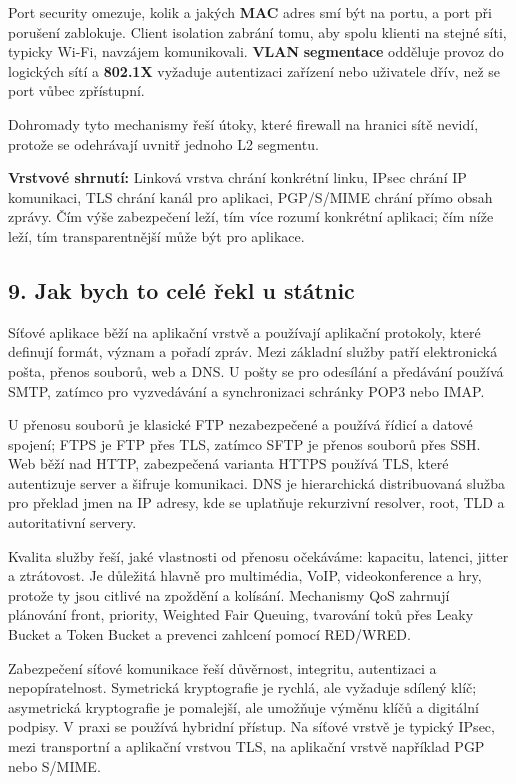 \documentclass[11pt,a4paper]{article}
\newcommand{\itbox}[1]{\medskip\noindent\colorbox{black!6}{\parbox{\dimexpr\linewidth-2\fboxsep}{#1}}\medskip}
\begin{document}
Port security omezuje, kolik a jakých \textbf{MAC} adres smí být na portu, a port při porušení zablokuje. Client isolation zabrání tomu, aby spolu klienti na stejné síti, typicky Wi-Fi, navzájem komunikovali. \textbf{VLAN} \textbf{segmentace} odděluje provoz do logických sítí a \textbf{802.1X} vyžaduje autentizaci zařízení nebo uživatele dřív, než se port vůbec zpřístupní.

Dohromady tyto mechanismy řeší útoky, které firewall na hranici sítě nevidí, protože se odehrávají uvnitř jednoho L2 segmentu.

\itbox{\textbf{Vrstvové shrnutí:} Linková vrstva chrání konkrétní linku, IPsec chrání IP komunikaci, TLS chrání kanál pro aplikaci, PGP/S/MIME chrání přímo obsah zprávy. Čím výše zabezpečení leží, tím více rozumí konkrétní aplikaci; čím níže leží, tím transparentnější může být pro aplikace.}

\subsection*{9. Jak bych to celé řekl u státnic}

Síťové aplikace běží na aplikační vrstvě a používají aplikační protokoly, které definují formát, význam a pořadí zpráv. Mezi základní služby patří elektronická pošta, přenos souborů, web a DNS. U pošty se pro odesílání a předávání používá SMTP, zatímco pro vyzvedávání a synchronizaci schránky POP3 nebo IMAP.

U přenosu souborů je klasické FTP nezabezpečené a používá řídicí a datové spojení; FTPS je FTP přes TLS, zatímco SFTP je přenos souborů přes SSH. Web běží nad HTTP, zabezpečená varianta HTTPS používá TLS, které autentizuje server a šifruje komunikaci. DNS je hierarchická distribuovaná služba pro překlad jmen na IP adresy, kde se uplatňuje rekurzivní resolver, root, TLD a autoritativní servery.

Kvalita služby řeší, jaké vlastnosti od přenosu očekáváme: kapacitu, latenci, jitter a ztrátovost. Je důležitá hlavně pro multimédia, VoIP, videokonference a hry, protože ty jsou citlivé na zpoždění a kolísání. Mechanismy QoS zahrnují plánování front, priority, Weighted Fair Queuing, tvarování toků přes Leaky Bucket a Token Bucket a prevenci zahlcení pomocí RED/WRED.

Zabezpečení síťové komunikace řeší důvěrnost, integritu, autentizaci a nepopíratelnost. Symetrická kryptografie je rychlá, ale vyžaduje sdílený klíč; asymetrická kryptografie je pomalejší, ale umožňuje výměnu klíčů a digitální podpisy. V praxi se používá hybridní přístup. Na síťové vrstvě je typický IPsec, mezi transportní a aplikační vrstvou TLS, na aplikační vrstvě například PGP nebo S/MIME.
\end{document}
